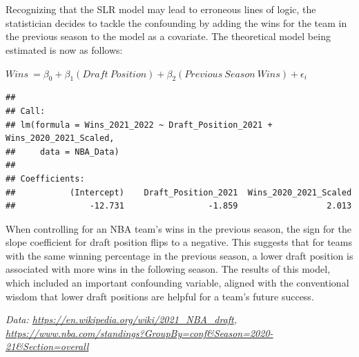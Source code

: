 \documentclass[
  11pt,
]{book}
\theoremstyle{definition}
\theoremstyle{definition}
\theoremstyle{definition}
\theoremstyle{definition}
\theoremstyle{remark}
\begin{document}
\(~\)

\(~\)

Recognizing that the SLR model may lead to erroneous lines of logic, the statistician decides to tackle the confounding by adding the wins for the team in the previous season to the model as a covariate. The theoretical model being estimated is now as follows:

\(Wins\ = \beta_0 + \beta_1(Draft\ Position) + \beta_2(Previous\ Season\ Wins) + \epsilon_i\)

\begin{verbatim}
## 
## Call:
## lm(formula = Wins_2021_2022 ~ Draft_Position_2021 + Wins_2020_2021_Scaled, 
##     data = NBA_Data)
## 
## Coefficients:
##           (Intercept)    Draft_Position_2021  Wins_2020_2021_Scaled  
##               -12.731                 -1.859                  2.013
\end{verbatim}

When controlling for an NBA team's wins in the previous season, the sign for the slope coefficient for draft position flips to a negative. This suggests that for teams with the same winning percentage in the previous season, a lower draft position is associated with more wins in the following season. The results of this model, which included an important confounding variable, aligned with the conventional wisdom that lower draft positions are helpful for a team's future success.

\emph{Data: \url{https://en.wikipedia.org/wiki/2021_NBA_draft}, \url{https://www.nba.com/standings?GroupBy=conf\&Season=2020-21\&Section=overall}}

  
\end{document}
